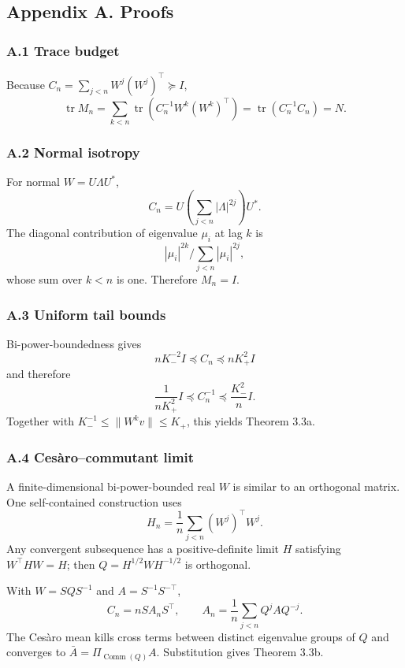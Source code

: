 \documentclass[
  10pt,
]{article}
\begin{document}
\subsection{Appendix A. Proofs}\label{appendix-a.-proofs}

\subsubsection{A.1 Trace budget}\label{a.1-trace-budget}

Because \(C_n=\sum_{j<n}W^j(W^j)^\top\succeq I\), \[
\operatorname{tr}M_n
=\sum_{k<n}\operatorname{tr}\!\left(C_n^{-1}W^k(W^k)^\top\right)
=\operatorname{tr}(C_n^{-1}C_n)=N.
\]

\subsubsection{A.2 Normal isotropy}\label{a.2-normal-isotropy}

For normal \(W=U\Lambda U^*\), \[
C_n=U\left(\sum_{j<n}|\Lambda|^{2j}\right)U^*.
\] The diagonal contribution of eigenvalue \(\mu_i\) at lag \(k\) is \[
|\mu_i|^{2k}/\sum_{j<n}|\mu_i|^{2j},
\] whose sum over \(k<n\) is one. Therefore \(M_n=I\).

\subsubsection{A.3 Uniform tail bounds}\label{a.3-uniform-tail-bounds}

Bi-power-boundedness gives \[
nK_-^{-2}I\preceq C_n\preceq nK_+^2I
\] and therefore \[
\frac1{nK_+^2}I\preceq C_n^{-1}\preceq\frac{K_-^2}{n}I.
\] Together with \(K_-^{-1}\le\|W^kv\|\le K_+\), this yields Theorem
3.3a.

\subsubsection{A.4 Cesàro--commutant
limit}\label{a.4-cesuxe0rocommutant-limit}

A finite-dimensional bi-power-bounded real \(W\) is similar to an
orthogonal matrix. One self-contained construction uses \[
H_n=\frac1n\sum_{j<n}(W^j)^\top W^j.
\] Any convergent subsequence has a positive-definite limit \(H\)
satisfying \(W^\top HW=H\); then \(Q=H^{1/2}WH^{-1/2}\) is orthogonal.

With \(W=SQS^{-1}\) and \(A=S^{-1}S^{-\top}\), \[
C_n=nSA_nS^\top,\qquad
A_n=\frac1n\sum_{j<n}Q^jAQ^{-j}.
\] The Cesàro mean kills cross terms between distinct eigenvalue groups
of \(Q\) and converges to \(\bar A=\Pi_{\operatorname{Comm}(Q)}A\).
Substitution gives Theorem 3.3b.
\end{document}
